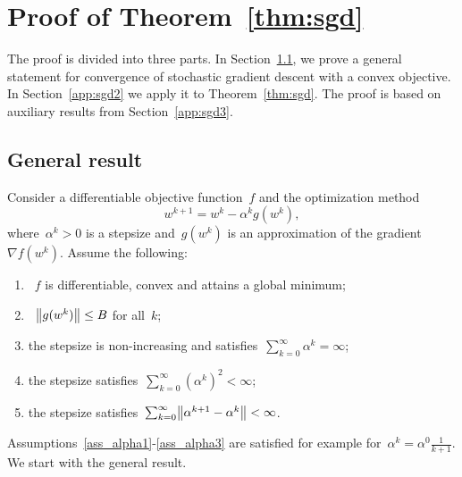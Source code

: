 \section{Proof of Theorem~\ref{thm:sgd}}

The proof is divided into three parts. In Section~\ref{app:sgd1}, we prove a general statement for convergence of stochastic gradient descent with a convex objective. In Section~\ref{app:sgd2} we apply it to Theorem~\ref{thm:sgd}. The proof is based on auxiliary results from Section~\ref{app:sgd3}.

\subsection{General result}\label{app:sgd1}

Consider a differentiable objective function~$f$ and the optimization method
\begin{equation}\label{eq:update}
  w^{k+1}=w^k-\alpha^kg(w^k),
\end{equation}
where~$\alpha^k>0$ is a stepsize and~$g(w^k)$ is an approximation of the gradient~$\nabla f(w^k)$. Assume the following:
\begin{enumerate}[label={(A\arabic*)}]
  \item \label{ass_convex}~$f$ is differentiable, convex and attains a global minimum;
  \item \label{ass_gbound}~$\norm{g(w^k)}\le B$ for all~$k$;
  \item \label{ass_alpha1} the stepsize is non-increasing and satisfies~$\sum_{k=0}^\infty \alpha^k=\infty$;
  \item \label{ass_alpha2} the stepsize satisfies~$\sum_{k=0}^\infty (\alpha^k)^2<\infty$;
  \item \label{ass_alpha3} the stepsize satisfies~$\sum_{k=0}^\infty \nrm{\alpha^{k+1}-\alpha^k}<\infty$.
\end{enumerate}
Assumptions~\ref{ass_alpha1}-\ref{ass_alpha3} are satisfied for example for~$\alpha^k=\alpha^0\frac{1}{k+1}$. We start with the general result.

